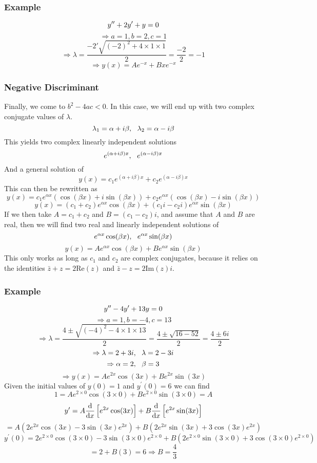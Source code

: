 \documentclass[12pt]{report}
\begin{document}
\begin{flushleft}
\subsubsection*{Example}

\[y^{\prime\prime} + 2y^\prime + y = 0\]
\[\Rightarrow a = 1, b = 2, c = 1\]
\[\Rightarrow \lambda = \frac{-2 \prime \sqrt{(-2)^2 + 4\times1\times1}}{2}
= \frac{-2}{2} = -1\]
\[\Rightarrow y(x) = Ae^{-x} + Bxe^{-x}\]

\subsubsection*{Negative Discriminant}

Finally, we come to \(b^2 - 4ac < 0\). In this case, we will end up with two
complex conjugate values of \(\lambda\).
\[\lambda_1 = \alpha + i\beta, \:\:\: \lambda_2 = \alpha - i\beta\]
This yields two complex linearly independent solutions
\[e^{(\alpha + i\beta)x}, \:\:\: e^{(\alpha - i\beta)x}\]
And a general solution of 
\[y(x) = c_1e^{(\alpha + i\beta)x} + c_2e^{(\alpha - i\beta)x}\]
This can then be rewritten as
\[y(x) = c_1e^{\alpha x}(\cos(\beta x) + i\sin(\beta x))
+ c_2e^{\alpha x}(\cos(\beta x) - i\sin(\beta x))\]
\[y(x) = (c_1 + c_2)e^{\alpha x}\cos(\beta x) + (c_1i - c_2i)e^{\alpha x}
\sin(\beta x)\]
If we then take \(A = c_1 + c_2\) and \(B = (c_1 - c_2)i\), and assume that
\(A\) and \(B\) are real, then we will find two real and linearly independent
solutions of 
\[e^{\alpha x}\cos(\beta x), \:\:\: e^{\alpha x}\sin(\beta x)\]
\[y(x) = Ae^{\alpha x}\cos(\beta x) + Be^{\alpha x}\sin(\beta x)\]
This only works as long as \(c_1\) and \(c_2\) are complex conjugates, because
it relies on the identities \(\bar{z} + z = 2\mathrm{Re}(z)\) and 
\(\bar{z} - z = 2\mathrm{Im}(z)i\).

\subsubsection*{Example}

\begin{center}
    \[y^{\prime\prime} - 4y^\prime + 13y = 0\]
    \[\Rightarrow a = 1, b = -4, c = 13\]
    \[\Rightarrow \lambda = \frac{4 \pm \sqrt{(-4)^2 - 4\times1\times13}}{2}
    = \frac{4 \pm \sqrt{16 - 52}}{2} = \frac{4 \pm 6i}{2}\]
    \[\Rightarrow \lambda = 2 + 3i, \:\:\: \lambda = 2 - 3i\]
    \[\Rightarrow \alpha = 2, \:\:\: \beta = 3\]
    \[\Rightarrow y(x) = Ae^{2x}\cos(3x) + Be^{2x}\sin(3x)\]
    Given the initial values of \(y(0) = 1\) and \(y^\prime(0) = 6\) we can
    find
    \[1 = Ae^{2\times0}\cos(3\times0) + Be^{2\times0}\sin(3\times0) = A\]
    \[y^\prime = A\frac{\mathrm{d}}{\mathrm{d}x}\left[e^{2x}\cos(3x)\right] + B\frac{\mathrm{d}}{\mathrm{d}x}\left[e^{2x}\sin(3x)\right]\]
    \[= A(2e^{2x}\cos(3x) - 3\sin(3x)e^{2x}) + B(2e^{2x}\sin(3x) 
    + 3\cos(3x)e^{2x})\]
    \[y^\prime(0) = 2e^{2\times0}\cos(3\times0) - 3\sin(3\times0)e^{2\times0}
    + B(2e^{2\times0}\sin(3\times0) + 3\cos(3\times0)e^{2\times0})\]
    \[= 2 + B(3) = 6 \Rightarrow B = \frac{4}{3}\]
\end{center}


\end{flushleft}
\end{document}
